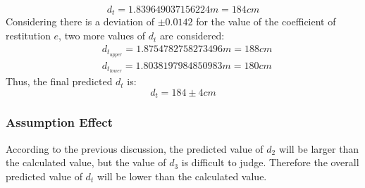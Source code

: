 \documentclass{article}
\begin{document}
            $$d_t = 1.839649037156224m = 184cm$$  
            Considering there is a deviation of $\pm 0.0142$ for the value of the coefficient of restitution $e$, two more values of $d_t$ are considered:
            \begin{align}
                &d_{t_{upper}} = 1.8754782758273496m = 188cm \nonumber\\
                &d_{t_{lower}} = 1.8038197984850983m = 180cm \nonumber
            \end{align}
            Thus, the final predicted $d_t$ is:
            \begin{equation}
                d_t = 184 \pm 4cm \label{ans:1}
            \end{equation}
    \subsubsection{Assumption Effect}
    According to the previous discussion, the predicted value of $d_2$ will be larger than the calculated value, but the value of $d_3$ is difficult to judge. Therefore the overall predicted value of $d_t$ will be lower than the calculated value.
\end{document}
